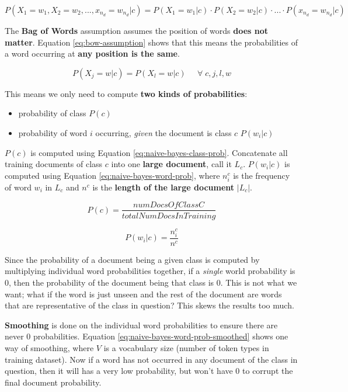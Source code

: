\documentclass{article}
\begin{document}
\begin{equation}
	P(X_1 = w_1, X_2 = w_2, ..., x_{n_d} = w_{n_d} | c) = P(X_1 = w_1|c) \cdot P(X_2 = w_2 | c) \cdot ... \cdot P(x_{n_d} = w_{n_d}|c)
	\label{eq:conditional-independence}
\end{equation}

The \textbf{Bag of Words} assumption assumes the position of words \textbf{does not matter}. Equation \ref{eq:bow-assumption} shows that this means the probabilities of a word occurring at \textbf{any position is the same}.

\begin{equation}
	P(X_j = w | c) = P(X_l = w| c)  \;\;\;\;\;
	\forall \; c,j,l,w
	\label{eq:bow-assumption}
\end{equation}

This means we only need to compute \textbf{two kinds of probabilities}:
\begin{itemize}
	\item probability of class $P(c)$
	\item probability of word $i$ occurring, \textit{given} the document is class $c$ $P(w_i|c)$
\end{itemize}
$P(c)$ is computed using Equation \ref{eq:naive-bayes-class-prob}. Concatenate all training documents of class $c$ into one \textbf{large document}, call it $L_c$. $P(w_i|c)$ is computed using Equation \ref{eq:naive-bayes-word-prob}, where $n_i^c$ is the frequency of word $w_i$ in $L_c$ and $n^c$ is the \textbf{length of the large document} $|L_c|$.

\begin{equation}
	P(c) = \frac{numDocsOfClassC}{totalNumDocsInTraining}
	\label{eq:naive-bayes-class-prob}
\end{equation}

\begin{equation}
	P(w_i|c) = \frac{n_i^c}{n^c}
	\label{eq:naive-bayes-word-prob}
\end{equation}

Since the probability of a document being a given class is computed by multiplying individual word probabilities together, if a \textit{single} world probability is 0, then the probability of the document being that class is 0. This is not what we want; what if the word is just unseen and the rest of the document are words that are representative of the class in question? This skews the results too much.

\textbf{Smoothing} is done on the individual word probabilities to ensure there are never 0 probabilities. Equation \ref{eq:naive-bayes-word-prob-smoothed} shows one way of smoothing, where $V$ is a vocabulary size (number of token types in training dataset). Now if a word has not occurred in any document of the class in question, then it will has a very low probability, but won't have 0 to corrupt the final document probability.
\end{document}
